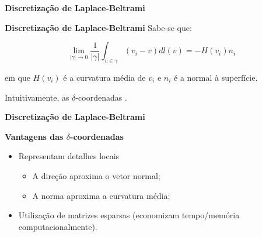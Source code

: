 \begin{frame}{{\bf \color{blue} Discretização de Laplace-Beltrami}}

\begin{block}{\bf Discretização de Laplace-Beltrami}
Sabe-se que:

$$\lim\limits_{|\gamma|\rightarrow 0} \frac{1}{|\gamma|} \int_{v \in \gamma} (v_i - v) dl(v) = -H(v_i) n_i$$

em que $H(v_i)$ é a curvatura média de $v_i$ e $n_i$ é a normal à superfície.

\medskip

Intuitivamente, as $\delta$-coordenadas .
	
\end{block}
\end{frame}


\begin{frame}{{\bf \color{blue} Discretização de Laplace-Beltrami}}

\begin{block}{\bf Vantagens das $\delta$-coordenadas}
\begin{itemize}
    \item Representam detalhes locais
    \begin{itemize}
        \item A direção aproxima o vetor normal;
        \item A norma aproxima a curvatura média;
    \end{itemize}
    \medskip
    \item Utilização de matrizes esparsas (economizam tempo/memória computacionalmente).
\end{itemize}
\end{block}

\end{frame}



